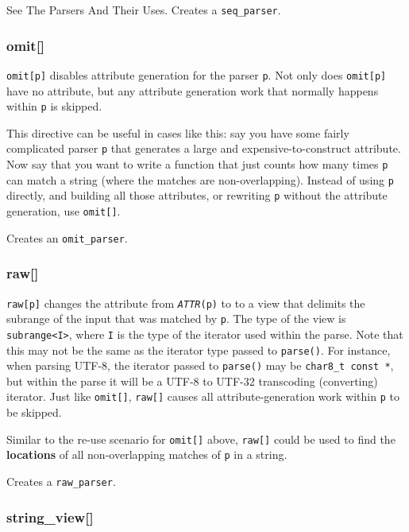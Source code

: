 See The Parsers And Their Uses. Creates a \texttt{seq\_parser}.

\subsubsection{omit{[}{]}}

\texttt{omit{[}p{]}} disables attribute generation for the parser \texttt{p}. Not only does \texttt{omit{[}p{]}} have no attribute, but any attribute generation work that normally happens within \texttt{p} is skipped.

This directive can be useful in cases like this: say you have some fairly complicated parser \texttt{p} that generates a large and expensive-to-construct attribute. Now say that you want to write a function that just counts how many times \texttt{p} can match a string (where the matches are non-overlapping). Instead of using \texttt{p} directly, and building all those attributes, or rewriting \texttt{p} without the attribute generation, use \texttt{omit{[}{]}}.

Creates an \texttt{omit\_parser}.

\label{tutorial_split_003.html}{}

\subsubsection{raw{[}{]}}

\texttt{raw{[}p{]}} changes the attribute from \emph{\texttt{ATTR}}\texttt{(p)} to to a view that delimits the subrange of the input that was matched by \texttt{p}. The type of the view is \texttt{subrange<I>}, where \texttt{I} is the type of the iterator used within the parse. Note that this may not be the same as the iterator type passed to \texttt{parse()}. For instance, when parsing UTF-8, the iterator passed to \texttt{parse()} may be \texttt{char8\_t const *}, but within the parse it will be a UTF-8 to UTF-32 transcoding (converting) iterator. Just like \texttt{omit{[}{]}}, \texttt{raw{[}{]}} causes all attribute-generation work within \texttt{p} to be skipped.

Similar to the re-use scenario for \texttt{omit{[}{]}} above, \texttt{raw{[}{]}} could be used to find the \textbf{locations} of all non-overlapping matches of \texttt{p} in a string.

Creates a \texttt{raw\_parser}.

\subsubsection{string\_view{[}{]}}

